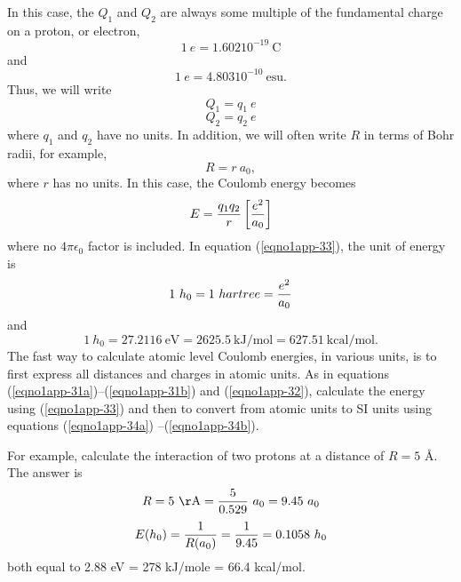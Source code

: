 In this case, the $Q_1$ and $Q_2$ are always some multiple of the fundamental 
charge on a proton, or electron,
\begin{equation}
1\ e = 1.60210^{-19}\ \mathrm{C}
\end{equation}
and
\begin{equation}
1\ e = 4.80310^{-10}\ \mathrm{esu}.
\end{equation}
Thus, we will write
\begin{equation}
Q_1 = q_1\ e
\label{eqno1app-31a}
\end{equation}
\begin{equation}
Q_2 = q_2\ e
\label{eqno1app-31b}
\end{equation}
where $q_1$ and $q_2$ have no units. In addition, we will often 
write $R$ in terms of Bohr radii, for example,
\begin{equation}
R = r\ a_0,
\label{eqno1app-32}
\end{equation}
where $r$ has no units. In this case, the Coulomb energy becomes
\begin{equation}
E = {q_1q_2 \over r} \left[ {e^2 \over a_0} \right]
\label{eqno1app-33}
\end{equation}
where no $4 \pi \epsilon_0$ factor is included. In equation
(\ref{eqno1app-33}), the unit of energy is
\begin{equation}
1\ h_0 = 1\ hartree = {e^2 \over a_0}
\label{eqno1app-34a}
\end{equation}
and
\begin{equation}
1\ h_0 = 27.2116\ \mathrm{eV} = 2625.5\ \mathrm{kJ}/\mathrm{mol} 
         = 627.51\ \mathrm{kcal}/\mathrm{mol}.
\label{eqno1app-34b}
\end{equation}
The fast way to calculate atomic level Coulomb energies, in various
units, is to first express all distances and charges in atomic
units. As in equations (\ref{eqno1app-31a})--(\ref{eqno1app-31b}) and
(\ref{eqno1app-32}), calculate the energy using (\ref{eqno1app-33})
and then to convert from atomic units to SI units using equations
(\ref{eqno1app-34a}) --(\ref{eqno1app-34b}).
    
For example, calculate the interaction of two protons at a distance 
of $R = 5$ \AA. The answer is
\begin{equation}
R = 5\ \mathrm{\AA} = {5 \over 0.529}\ a_0 = 9.45\ a_0
\end{equation}
\begin{equation}
E(h_0) = {1 \over R(a_0)} = {1 \over 9.45} = 0.1058\ h_0
\end{equation}
both equal to 2.88 eV = 278 kJ/mole = 66.4 kcal/mol.
    
